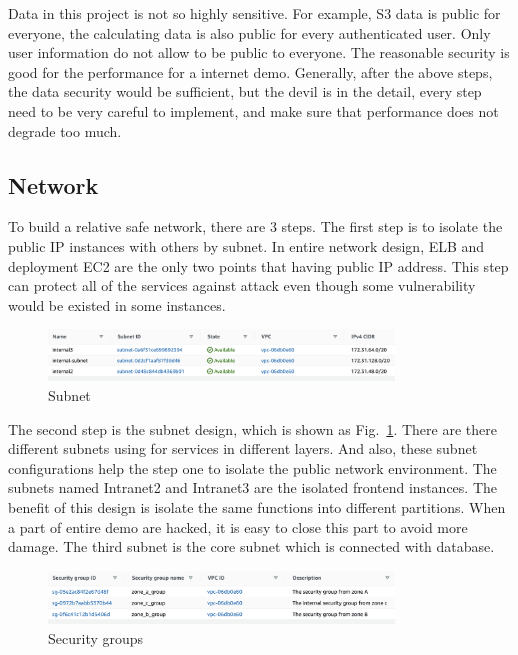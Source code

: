 \documentclass[conference]{IEEEtran}
\begin{document}
Data in this project is not so highly sensitive. For example, S3 data is public for everyone, the calculating data is also public for every authenticated user. Only user 
information do not allow to be public to everyone. The reasonable security is good for the performance for a internet demo. Generally, after the above steps, the data 
security would be sufficient, but the devil is in the detail, every step need to be very careful to implement, and make sure that performance does not degrade too much.

\subsection{Network}

To build a relative safe network, there are 3 steps. The first step is to isolate the public IP instances with others by subnet. In entire network design, 
ELB and deployment EC2 are the only two points that having public IP address. This step can protect all of the services against attack even though some vulnerability 
would be existed in some instances.

\begin{figure}[htbp]
    \centerline{\includegraphics[width=260pt]{images/subnet.png}}
    \caption{Subnet}
    \label{subnet}
\end{figure}

The second step is the subnet design, which is shown as Fig.~\ref{subnet}. There are there different subnets using for services in different layers. And also, 
these subnet configurations help the step one to isolate the public network environment. The subnets named Intranet2 and Intranet3 are the isolated frontend 
instances. The benefit of this design is isolate the same functions into different partitions. When a part of entire demo are hacked, it is easy 
to close this part to avoid more damage. The third subnet is the core subnet which is connected with database.

\begin{figure}[htbp]
    \centerline{\includegraphics[width=260pt]{images/security.png}}
    \caption{Security groups}
    \label{Security}
\end{figure}
\end{document}
